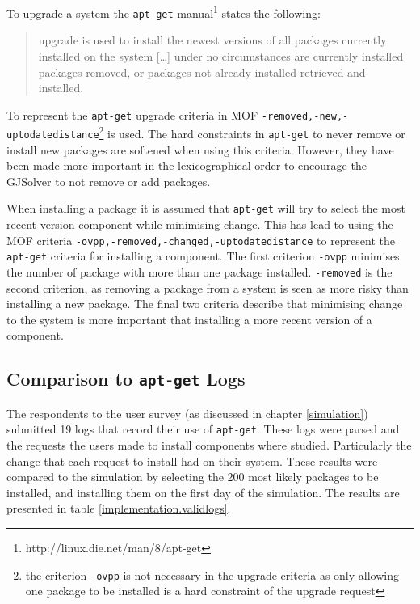 To upgrade a system the \texttt{apt-get} manual\footnote{http://linux.die.net/man/8/apt-get} states the following:
\begin{quotation}
upgrade is used to install the newest versions of all packages currently installed on the system 
[\ldots] 
under no circumstances are currently installed packages removed, or packages not already installed retrieved and installed.
\end{quotation}
To represent the \texttt{apt-get} upgrade criteria in MOF 
\texttt{-removed,-new,-uptodatedistance}\footnote{the criterion \texttt{-ovpp} is not necessary in the upgrade criteria 
as only allowing one package to be installed is a hard constraint of the upgrade request} 
is used.
The hard constraints in \texttt{apt-get} to never remove or install new packages are softened when using this criteria.
However, they have been made more important in the lexicographical order to encourage the GJSolver to not remove or add packages.

When installing a package it is assumed that \texttt{apt-get} will try to select the most recent version component while minimising change.
This has lead to using the MOF criteria \texttt{-ovpp,-removed,-changed,-uptodatedistance} to represent the \texttt{apt-get} criteria for installing a component.
The first criterion \texttt{-ovpp} minimises the number of package with more than one package installed.
\texttt{-removed} is the second criterion, as removing a package from a system is seen as more risky than installing a new package.
The final two criteria describe that minimising change to the system is more important that installing a more recent version of a component.

\subsection{Comparison to \texttt{apt-get} Logs}
The respondents to the user survey (as discussed in chapter \ref{simulation}) submitted 19 logs that record their use of \texttt{apt-get}.
These logs were parsed and the requests the users made to install components where studied.
Particularly the change that each request to install had on their system.
These results were compared to the simulation by selecting the 200 most likely packages to be installed, and installing them on the first day of the simulation.
The results are presented in table \ref{implementation.validlogs}.

